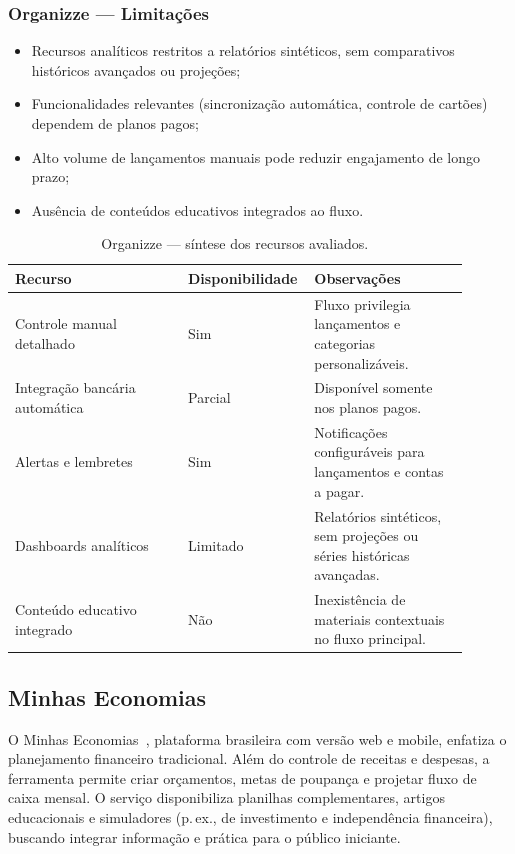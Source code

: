 \subsubsection*{Organizze — Limitações}
\begin{itemize}
    \item Recursos analíticos restritos a relatórios sintéticos, sem comparativos históricos avançados ou projeções;
    \item Funcionalidades relevantes (sincronização automática, controle de cartões) dependem de planos pagos;
    \item Alto volume de lançamentos manuais pode reduzir engajamento de longo prazo;
    \item Ausência de conteúdos educativos integrados ao fluxo.
\end{itemize}

\begin{table}[H]
\centering
\caption{Organizze — síntese dos recursos avaliados.}
\label{tab:organizze_comparativo}
\begin{tabular}{p{0.37\linewidth}p{0.2\linewidth}p{0.33\linewidth}}
\hline
\textbf{Recurso} & \textbf{Disponibilidade} & \textbf{Observações} \\
\hline
Controle manual detalhado & Sim & Fluxo privilegia lançamentos e categorias personalizáveis. \\
Integração bancária automática & Parcial & Disponível somente nos planos pagos. \\
Alertas e lembretes & Sim & Notificações configuráveis para lançamentos e contas a pagar. \\
Dashboards analíticos & Limitado & Relatórios sintéticos, sem projeções ou séries históricas avançadas. \\
Conteúdo educativo integrado & Não & Inexistência de materiais contextuais no fluxo principal. \\
\hline
\end{tabular}
\end{table}

\subsection{Minhas Economias}\label{subsec:minhas_economias}

O Minhas Economias~\cite{MINHASECONOMIAS2025}, plataforma brasileira com versão web e mobile, enfatiza o planejamento financeiro tradicional. Além do controle de receitas e despesas, a ferramenta permite criar orçamentos, metas de poupança e projetar fluxo de caixa mensal. O serviço disponibiliza planilhas complementares, artigos educacionais e simuladores (p.\,ex., de investimento e independência financeira), buscando integrar informação e prática para o público iniciante.

